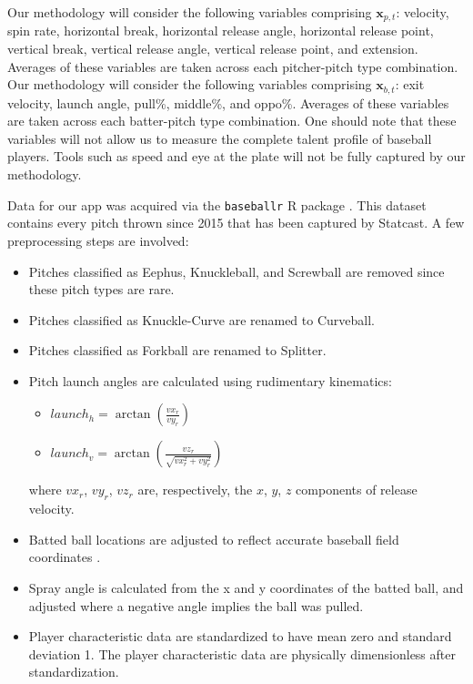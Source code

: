 \documentclass[12pt]{article}
\newcommand{\x}{\textbf{x}}
\begin{document}
Our methodology will consider the following variables comprising $\x_{p,t}$: velocity, spin rate, horizontal break, horizontal release angle, horizontal release point, vertical break, vertical release angle, vertical release point, and extension. Averages of these variables are taken across each pitcher-pitch type combination. Our methodology will consider the following variables comprising $\x_{b,t}$: exit velocity, launch angle, pull\%, middle\%, and oppo\%. Averages of these variables are taken across each batter-pitch type combination. One should note that these variables will not allow us to measure the complete talent profile of baseball players. %
Tools such as speed and eye at the plate will not be fully captured by our methodology.

Data for our app was acquired via the \texttt{baseballr} R package \citep{baseballr}. This dataset contains every pitch thrown since 2015 that has been captured by Statcast. A few preprocessing steps are involved:
\begin{itemize}
    \item Pitches classified as Eephus, Knuckleball, and Screwball are removed since these pitch types are rare.
    \item Pitches classified as Knuckle-Curve are renamed to Curveball.
    \item Pitches classified as Forkball are renamed to Splitter.
    \item Pitch launch angles are calculated using rudimentary kinematics:
        \begin{itemize}
            \item $launch_h = \arctan(\frac{vx_r}{vy_r})$
            \item $launch_v = \arctan\left(\frac{vz_r}{\sqrt{vx_r^2 + vy_r^2}}\right)$
        \end{itemize}
        where $vx_r$, $vy_r$, $vz_r$ are, respectively, the $x$, $y$, $z$ components of release velocity.
    \item Batted ball locations are adjusted to reflect accurate baseball field coordinates \citep{petti2017research}.
    \item Spray angle is calculated from the x and y coordinates of the batted ball, and adjusted where a negative angle implies the ball was pulled.
    \item Player characteristic data are standardized to have mean zero and standard deviation 1. The player characteristic data are physically dimensionless after standardization. 
\end{itemize}
\end{document}
